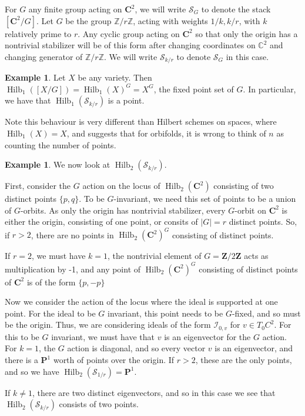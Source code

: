 \documentclass{amsart}[12pt]
\theoremstyle{definition}
\newtheorem{example}[dummy]{Example}
\newcommand{\Z}{\mathbf{Z}}
\newcommand{\C}{\mathbf{C}}
\newcommand{\II}{\mathcal{I}}
\newcommand{\proj}{\mathbf{P}}
\newcommand{\Sur}{\mathcal{S}}
\DeclareMathOperator{\Hilb}{Hilb}
\begin{document}
For $G$ any finite group acting on $\C^2$, we will write $\mathcal{S}_G$ to denote the stack $[\C^2/G]$. Let $G$ be the group $\mathbb{Z}/r\mathbb{Z}$, acting with weights $1/k, k/r$, with $k$ relatively prime to $r$.  Any cyclic group acting on $\C^2$ so that only the origin has a nontrivial stabilizer will be of this form after changing coordinates on $\mathbb{C}^2$ and changing generator of $\mathbb{Z}/r\mathbb{Z}$.  We will write $\mathcal{S}_{k/r}$ to denote $\mathcal{S}_G$ in this case.


\begin{example}
Let $X$ be any variety.  Then $\Hilb_1([X/G])=\Hilb_1(X)^G=X^G$, the fixed point set of $G$.  In particular, we have that $\Hilb_1(\Sur_{k/r})$ is a point.

Note this behaviour is very different than Hilbert schemes on spaces, where $\Hilb_1(X)=X$, and suggests that for orbifolds, it is wrong to think of $n$ as counting the number of points.
\end{example}

\begin{example}
We now look at $\Hilb_2(\Sur_{k/r})$.  

First, consider the $G$ action on the locus of $\Hilb_2(\C^2)$ consisting of two distinct points $\{p, q\}$.  To be $G$-invariant, we need this set of points to be a union of $G$-orbits.   As only the origin has nontrivial stabilizer, every $G$-orbit on $\C^2$ is either the origin, consisting of one point, or consits of $|G|=r$ distinct points.  So, if $r>2$, there are no points in $\Hilb_2(\C^2)^G$ consisting of distinct points.  

If $r=2$, we must have $k=1$, the nontrivial element of $G=\Z/2\Z$ acts as multiplication by -1, and any point of $\Hilb_2(\C^2)^G$ consisting of distinct points of $\C^2$ is of the form $\{p,-p\}$

Now we consider the action of the locus where the ideal is supported at one point.  For the ideal to be $G$ invariant, this point needs to be $G$-fixed, and so must be the origin.  Thus, we are considering ideals of the form $\II_{0, v}$ for $v\in T_0C^2$.  For this to be $G$ invariant, we must have that $v$ is an eigenvector for the $G$ action.  For $k=1$, the $G$ action is diagonal, and so every vector $v$ is an eigenvector, and there is a $\proj^1$ worth of points over the origin.  If $r>2$, these are the only points, and so we have $\Hilb_2(\mathcal{S}_{1/r})=\proj^1$.  


If $k\neq 1$, there are two distinct eigenvectors, and so in this case we see that $\Hilb_2(\mathcal{S}_{k/r})$ consists of two points.


\end{example}
\end{document}

